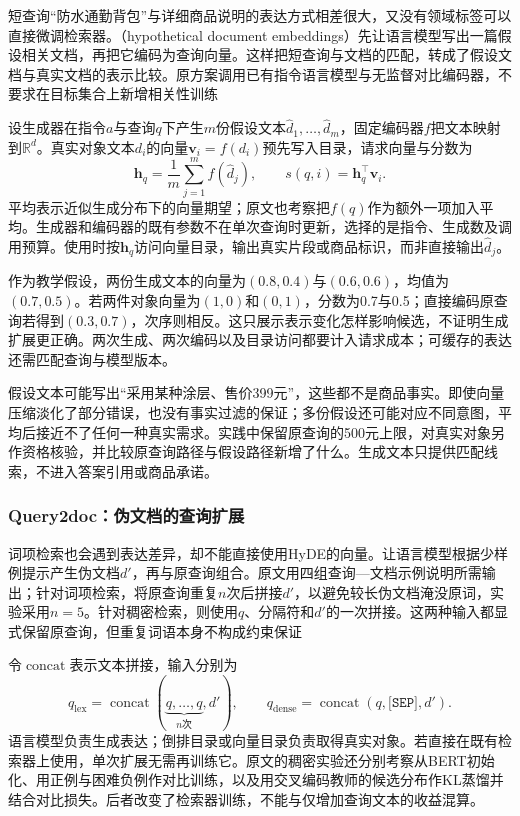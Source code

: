 短查询“防水通勤背包”与详细商品说明的表达方式相差很大，又没有领域标签可以直接微调检索器。（hypothetical document embeddings）先让语言模型写出一篇假设相关文档，再把它编码为查询向量。这样把短查询与文档的匹配，转成了假设文档与真实文档的表示比较。原方案调用已有指令语言模型与无监督对比编码器，不要求在目标集合上新增相关性训练

设生成器在指令$a$与查询$q$下产生$m$份假设文本$\widehat d_1,\ldots,\widehat d_m$，固定编码器$f$把文本映射到$\mathbb R^d$。真实对象文本$d_i$的向量$\bm v_i=f(d_i)$预先写入目录，请求向量与分数为
\begin{equation}
 \bm h_q=\frac1m\sum_{j=1}^{m}f(\widehat d_j),
 \qquad s(q,i)=\bm h_q^\top\bm v_i.
 \label{eq:rs-search-hyde}
\end{equation}
平均表示近似生成分布下的向量期望；原文也考察把$f(q)$作为额外一项加入平均。生成器和编码器的既有参数不在单次查询时更新，选择的是指令、生成数及调用预算。使用时按$\bm h_q$访问向量目录，输出真实片段或商品标识，而非直接输出$\widehat d_j$。

作为教学假设，两份生成文本的向量为$(0.8,0.4)$与$(0.6,0.6)$，均值为$(0.7,0.5)$。若两件对象向量为$(1,0)$和$(0,1)$，分数为0.7与0.5；直接编码原查询若得到$(0.3,0.7)$，次序则相反。这只展示表示变化怎样影响候选，不证明生成扩展更正确。两次生成、两次编码以及目录访问都要计入请求成本；可缓存的表达还需匹配查询与模型版本。

假设文本可能写出“采用某种涂层、售价399元”，这些都不是商品事实。即使向量压缩淡化了部分错误，也没有事实过滤的保证；多份假设还可能对应不同意图，平均后接近不了任何一种真实需求。实践中保留原查询的500元上限，对真实对象另作资格核验，并比较原查询路径与假设路径新增了什么。生成文本只提供匹配线索，不进入答案引用或商品承诺。

\Needspace{100mm}
\subsubsection{Query2doc：伪文档的查询扩展}
\label{sec:rs-search-query2doc}

词项检索也会遇到表达差异，却不能直接使用HyDE的向量。让语言模型根据少样例提示产生伪文档$d'$，再与原查询组合。原文用四组查询—文档示例说明所需输出；针对词项检索，将原查询重复$n$次后拼接$d'$，以避免较长伪文档淹没原词，实验采用$n=5$。针对稠密检索，则使用$q$、分隔符和$d'$的一次拼接。这两种输入都显式保留原查询，但重复词语本身不构成约束保证

令$\operatorname{concat}$表示文本拼接，输入分别为
\[
 q_{\mathrm{lex}}=\operatorname{concat}(\underbrace{q,\ldots,q}_{n\text{次}},d'),
 \qquad
 q_{\mathrm{dense}}=\operatorname{concat}(q,\texttt{[SEP]},d').
\]
语言模型负责生成表达；倒排目录或向量目录负责取得真实对象。若直接在既有检索器上使用，单次扩展无需再训练它。原文的稠密实验还分别考察从BERT初始化、用正例与困难负例作对比训练，以及用交叉编码教师的候选分布作KL蒸馏并结合对比损失。后者改变了检索器训练，不能与仅增加查询文本的收益混算。

